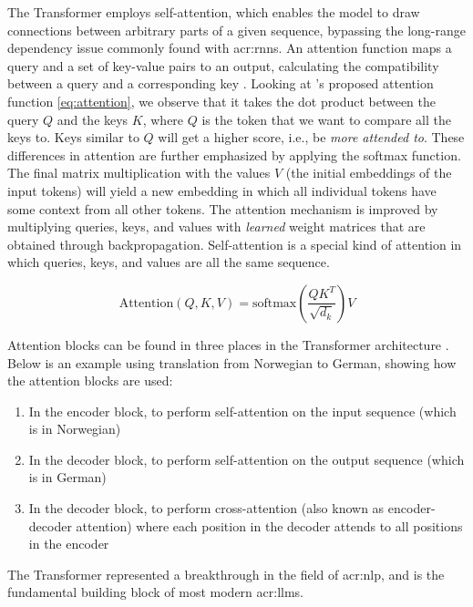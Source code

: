 The Transformer employs self-attention, which enables the model to draw connections between arbitrary parts of a given sequence, bypassing the long-range dependency issue commonly found with \glspl{acr:rnn}. An attention function maps a query and a set of key-value pairs to an output, calculating the compatibility between a query and a corresponding key \citep[3]{vaswaniAttentionAllYou2017}. Looking at \citeauthor{vaswaniAttentionAllYou2017}'s proposed attention function \eqref{eq:attention}, we observe that it takes the dot product between the query $Q$ and the keys $K$, where $Q$ is the token that we want to compare all the keys to. Keys similar to $Q$ will get a higher score, i.e., be \textit{more attended to}. These differences in attention are further emphasized by applying the softmax function. The final matrix multiplication with the values $V$ (the initial embeddings of the input tokens) will yield a new embedding in which all individual tokens have some context from all other tokens. The attention mechanism is improved by multiplying queries, keys, and values with \textit{learned} weight matrices that are obtained through backpropagation. Self-attention is a special kind of attention in which queries, keys, and values are all the same sequence.

\begin{equation}
    \text{Attention}(Q, K, V) = \text{softmax}\left(\frac{QK^T}{\sqrt{d_k}}\right)V
    \label{eq:attention}
\end{equation}

Attention blocks can be found in three places in the Transformer architecture \citep[5]{vaswaniAttentionAllYou2017}. Below is an example using translation from Norwegian to German, showing how the attention blocks are used:

\begin{enumerate}
    \item In the encoder block, to perform self-attention on the input sequence (which is in Norwegian)
    \item In the decoder block, to perform self-attention on the output sequence (which is in German)
    \item In the decoder block, to perform cross-attention (also known as encoder-decoder attention) where each position in the decoder attends to all positions in the encoder
\end{enumerate}

The Transformer represented a breakthrough in the field of \gls{acr:nlp}, and is the fundamental building block of most modern \glspl{acr:llm}.


